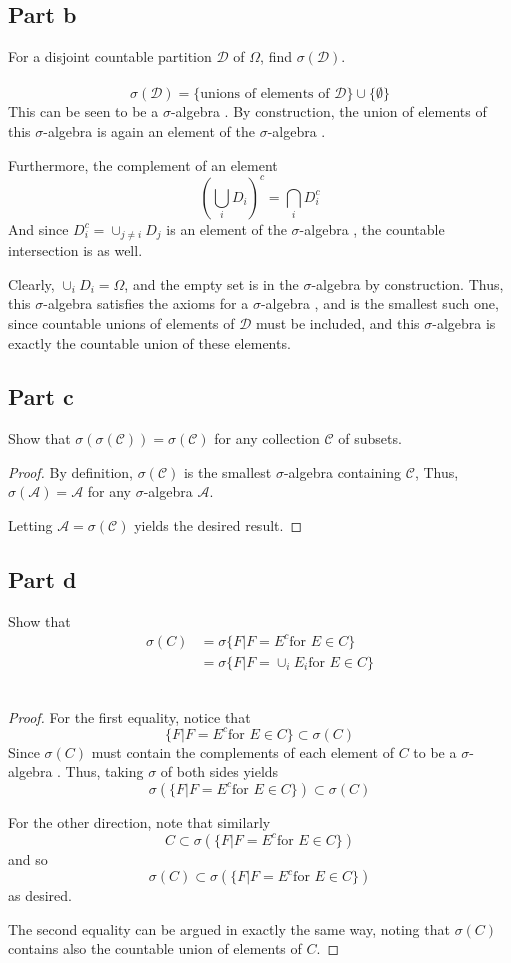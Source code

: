 \documentclass[paper=a4, fontsize=11pt]{scrartcl} %
\numberwithin{equation}{section} %
\numberwithin{figure}{section} %
\numberwithin{table}{section} %
\newcommand{\sigalg}{$\sigma$-algebra }
\begin{document}
\subsection*{Part b}
For a disjoint countable partition $\mathscr{D}$ of $\Omega$, find $\sigma(\mathscr{D})$.
\\
\\
\[
\sigma(\mathscr{D}) = \{\textrm{unions of elements of }\mathscr{D}\} \cup \{\emptyset\}
\]
This can be seen to be a \sigalg. By construction, the union of elements of this \sigalg
is again an element of the \sigalg.

Furthermore, the complement of an element
\[
(\bigcup_i D_i)^c = \bigcap_i D_i^c
\]
And since $D_i^c = \cup_{j\neq i} D_j$ is an element of the \sigalg, the countable
intersection is as well.

Clearly, $\cup_i D_i = \Omega$, and the empty set is in the \sigalg by construction.
Thus, this \sigalg satisfies the axioms for a \sigalg, and is the smallest such one,
since countable unions of elements of $\mathscr{D}$ must be included, and this \sigalg
is exactly the countable union of these elements.

\subsection*{Part c}
Show that $\sigma(\sigma(\mathscr{C})) = \sigma(\mathscr{C})$ for any collection $\mathscr{C}$
of subsets.
\\
\begin{proof}
By definition, $\sigma(\mathscr{C})$ is the smallest \sigalg containing $\mathscr{C}$,
Thus, $\sigma(\mathscr{A}) = \mathscr{A}$ for any \sigalg $\mathscr{A}$.

Letting $\mathscr{A} = \sigma(\mathscr{C})$ yields the desired result.
\end{proof}


\subsection*{Part d}
Show that 
\[
\begin{aligned}
\sigma(C) &= \sigma\{F | F = E^c \textrm{for } E\in C\}\\
        &= \sigma\{F | F = \cup_i E_i \textrm{for } E\in C\}
\end{aligned}
\]
\\
\begin{proof}
For the first equality, notice that
\[
\{F | F = E^c \textrm{for } E\in C\} \subset \sigma(C)
\]
Since $\sigma(C)$ must contain the complements of each element of $C$ to be a \sigalg.
Thus, taking $\sigma$ of both sides yields
\[
\sigma(\{F | F = E^c \textrm{for } E\in C\}) \subset \sigma(C)
\]

For the other direction, note that similarly
\[
C \subset \sigma(\{F | F = E^c \textrm{for } E\in C\})
\]
and so
\[
\sigma(C) \subset \sigma(\{F | F = E^c \textrm{for } E\in C\})
\]
as desired.

The second equality can be argued in exactly the same way,
noting that $\sigma(C)$ contains also the countable union of
elements of $C$.
\end{proof}
\end{document}
